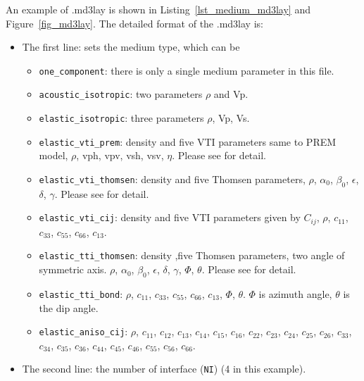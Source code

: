 An example of .md3lay is shown in Listing~\ref{lst_medium_md3lay} and Figure~\ref{fig_md3lay}.
The detailed format of the .md3lay is:
\begin{itemize}
  \item The first line: sets the medium type, which can be
    \begin{itemize}
    \item \verb|one_component|: there is only a single medium parameter in this file.
    \item \verb|acoustic_isotropic|: two parameters $\rho$ and Vp.
    \item \verb|elastic_isotropic|: three parameters $\rho$, Vp, Vs.
    \item \verb|elastic_vti_prem|:  density and five VTI parameters same to PREM model,
       $\rho$, vph, vpv, vsh, vsv, $\eta$. Please see \citep{dziewonski1981preliminary} for detail.
    \item \verb|elastic_vti_thomsen|: density and five Thomsen parameters,
        $\rho$, $\alpha_0$, $\beta_0$, $\epsilon$, $\delta$, $\gamma$.
        Please see \citep{ thomsen1986weak} for detail.
    \item \verb|elastic_vti_cij|: density and five VTI parameters given by $C_{ij}$,
         $\rho$, $c_{11}$, $c_{33}$, $c_{55}$, $c_{66}$, $c_{13}$. 
    \item \verb|elastic_tti_thomsen|: density ,five Thomsen parameters, two angle of symmetric axis.
         $\rho$, $\alpha_0$, $\beta_0$, $\epsilon$, $\delta$, $\gamma$, $\Phi$, $\theta$.
         Please see \citep{thomsen1986weak} for detail.
    \item \verb|elastic_tti_bond|:
          $\rho$, $c_{11}$, $c_{33}$, $c_{55}$, $c_{66}$, $c_{13}$, $\Phi$, $\theta$.
          $\Phi$ is azimuth angle, $\theta$ is the dip angle.
    \item \verb|elastic_aniso_cij|:
           $\rho$, $c_{11}$, $c_{12}$, $c_{13}$, $c_{14}$, $c_{15}$, $c_{16}$,  
                                      $c_{22}$, $c_{23}$, $c_{24}$, $c_{25}$, $c_{26}$, 
                                      $c_{33}$, $c_{34}$, $c_{35}$, $c_{36}$, $c_{44}$,
                                      $c_{45}$, $c_{46}$, $c_{55}$, $c_{56}$, $c_{66}$.

    \end{itemize}

  \item The second line: the number of interface (\texttt{NI}) (4 in this example).


\end{itemize}
